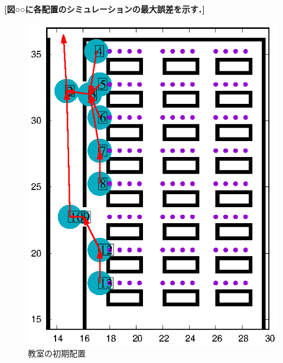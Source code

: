 \textbf{
[図○○に各配置のシミュレーションの最大誤差を示す．]
}


\clearpage
\begin{figure}[tb]
	\begin{minipage}[b]{0.5\columnwidth}
		\centering
		\includegraphics[width=\columnwidth]{figure/kyositu_v2.eps}
		\caption{教室の初期配置}
    \label{fig:kyositu_haichi}
	\end{minipage}
	\begin{minipage}[b]{0.5\columnwidth}
		\centering

\end{minipage}
\end{figure}

